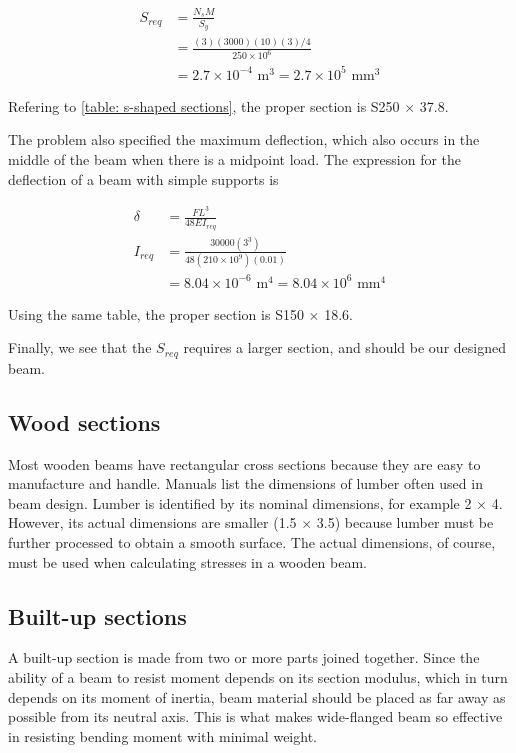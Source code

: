 \documentclass[a4paper,openany,12pt]{book}
\begin{document}
{{$$\begin{aligned}
    S_{req} &= \frac{N_s M}{S_y} \\
            &= \frac{(3)(3000)(10)(3)/4}{250 \times 10^6} \\
            &= 2.7 \times 10^{-4} \text{ m}^3 = 2.7 \times 10^5 \text{ mm}^3
  \end{aligned}$$

Refering to \ref{table: s-shaped sections},
the proper section is S250 \(\times\) 37.8.

The problem also specified the maximum deflection, which also occurs in
the middle of the beam when there is a midpoint load. The expression for
the deflection of a beam with simple supports is

$$\begin{aligned}
    \delta &= \frac{FL^3}{48EI_{req}} \\
    I_{req} &= \frac{30000(3^3)}{48(210 \times 10^9)(0.01)} \\
           &= 8.04 \times 10^{-6} \text{ m}^4 = 8.04 \times 10^6 \text{ mm}^4
  \end{aligned}$$

Using the same table, the proper section is S150 \(\times\) 18.6.

Finally, we see that the \(S_{req}\) requires a larger section, and should
be our designed beam.

\subsection{Wood sections}
\label{wood-sections}
Most wooden beams have rectangular cross sections because they are easy
to manufacture and handle. Manuals list the dimensions of lumber often
used in beam design. Lumber is identified by its nominal dimensions, for
example 2 \(\times\) 4. However, its actual dimensions are smaller (1.5
\(\times\) 3.5) because lumber must be further processed to obtain a
smooth surface. The actual dimensions, of course, must be used when
calculating stresses in a wooden beam.

\subsection{Built-up sections}
\label{built-up-sections}
A built-up section is made from two or more parts joined together. Since
the ability of a beam to resist moment depends on its section modulus,
which in turn depends on its moment of inertia, beam material should be
placed as far away as possible from its neutral axis. This is what makes
wide-flanged beam so effective in resisting bending moment with minimal
weight.

}}
\end{document}
